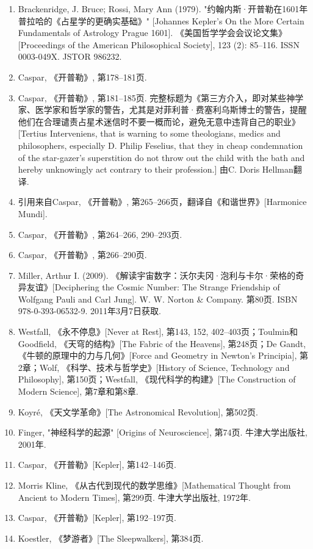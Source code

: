 \begin{enumerate}
\item Brackenridge, J. Bruce; Rossi, Mary Ann (1979). "约翰内斯·开普勒在1601年普拉哈的《占星学的更确实基础》" [Johannes Kepler's On the More Certain Fundamentals of Astrology Prague 1601]. 《美国哲学学会会议论文集》[Proceedings of the American Philosophical Society], 123 (2): 85–116. ISSN 0003-049X. JSTOR 986232.
\item Caspar, 《开普勒》, 第178–181页.
\item Caspar, 《开普勒》, 第181–185页. 完整标题为《第三方介入，即对某些神学家、医学家和哲学家的警告，尤其是对菲利普·费塞利乌斯博士的警告，提醒他们在合理谴责占星术迷信时不要一概而论，避免无意中违背自己的职业》[Tertius Interveniens, that is warning to some theologians, medics and philosophers, especially D. Philip Feselius, that they in cheap condemnation of the star-gazer's superstition do not throw out the child with the bath and hereby unknowingly act contrary to their profession.] 由C. Doris Hellman翻译.
\item 引用来自Caspar, 《开普勒》, 第265–266页，翻译自《和谐世界》[Harmonice Mundi].
\item Caspar, 《开普勒》, 第264–266, 290–293页.
\item Caspar, 《开普勒》, 第266–290页.
\item Miller, Arthur I. (2009). 《解读宇宙数字：沃尔夫冈·泡利与卡尔·荣格的奇异友谊》[Deciphering the Cosmic Number: The Strange Friendship of Wolfgang Pauli and Carl Jung]. W. W. Norton & Company. 第80页. ISBN 978-0-393-06532-9. 2011年3月7日获取.
\item Westfall, 《永不停息》[Never at Rest], 第143, 152, 402–403页；Toulmin和Goodfield, 《天穹的结构》[The Fabric of the Heavens], 第248页；De Gandt, 《牛顿的原理中的力与几何》[Force and Geometry in Newton's Principia], 第2章；Wolf, 《科学、技术与哲学史》[History of Science, Technology and Philosophy], 第150页；Westfall, 《现代科学的构建》[The Construction of Modern Science], 第7章和第8章.
\item Koyré, 《天文学革命》[The Astronomical Revolution], 第502页.
\item Finger, "神经科学的起源" [Origins of Neuroscience], 第74页. 牛津大学出版社, 2001年.
\item Caspar, 《开普勒》[Kepler], 第142–146页.
\item Morris Kline, 《从古代到现代的数学思维》[Mathematical Thought from Ancient to Modern Times], 第299页. 牛津大学出版社, 1972年.
\item Caspar, 《开普勒》[Kepler], 第192–197页.
\item Koestler, 《梦游者》[The Sleepwalkers], 第384页.

\end{enumerate}

